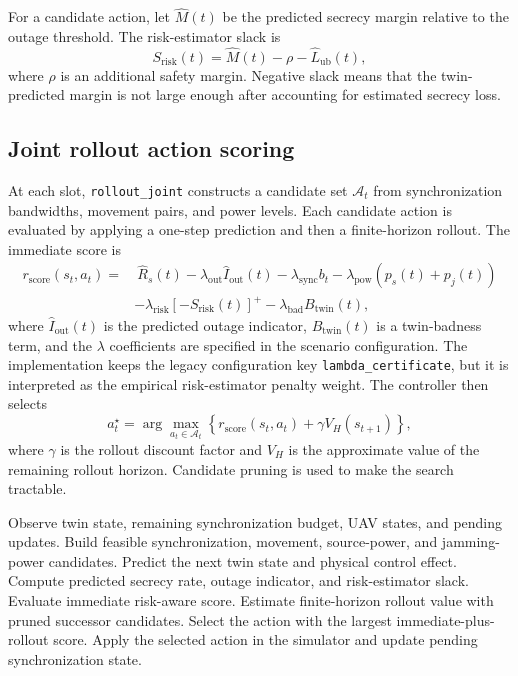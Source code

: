 For a candidate action, let $\widehat{M}(t)$ be the predicted secrecy margin relative to the outage threshold. The risk-estimator slack is
\begin{equation}
    S_{\mathrm{risk}}(t)=\widehat{M}(t)-\rho-\widehat{L}_{\mathrm{ub}}(t),
\end{equation}
where $\rho$ is an additional safety margin. Negative slack means that the twin-predicted margin is not large enough after accounting for estimated secrecy loss.

\subsection{Joint rollout action scoring}

At each slot, \texttt{rollout\_joint} constructs a candidate set $\mathcal{A}_t$ from synchronization bandwidths, movement pairs, and power levels. Each candidate action is evaluated by applying a one-step prediction and then a finite-horizon rollout. The immediate score is
\begin{align}
    r_{\mathrm{score}}(s_t,a_t) =
    &\ \widehat{R}_s(t)
    -\lambda_{\mathrm{out}}\widehat{I}_{\mathrm{out}}(t)
    -\lambda_{\mathrm{sync}} b_t
    -\lambda_{\mathrm{pow}}(p_s(t)+p_j(t)) \nonumber \\
    &-\lambda_{\mathrm{risk}}[ -S_{\mathrm{risk}}(t)]^+
    -\lambda_{\mathrm{bad}}B_{\mathrm{twin}}(t),
\end{align}
where $\widehat{I}_{\mathrm{out}}(t)$ is the predicted outage indicator, $B_{\mathrm{twin}}(t)$ is a twin-badness term, and the $\lambda$ coefficients are specified in the scenario configuration. The implementation keeps the legacy configuration key \texttt{lambda\_certificate}, but it is interpreted as the empirical risk-estimator penalty weight. The controller then selects
\begin{equation}
    a_t^\star=\arg\max_{a_t\in\mathcal{A}_t}
    \left\{
    r_{\mathrm{score}}(s_t,a_t)+\gamma V_H(s_{t+1})
    \right\},
\end{equation}
where $\gamma$ is the rollout discount factor and $V_H$ is the approximate value of the remaining rollout horizon. Candidate pruning is used to make the search tractable.

\begin{algorithm}[t]
\caption{Empirical-risk-aware joint rollout controller}
\label{alg:rollout}
\begin{algorithmic}[1]
\State Observe twin state, remaining synchronization budget, UAV states, and pending updates.
\State Build feasible synchronization, movement, source-power, and jamming-power candidates.
    \State Predict the next twin state and physical control effect.
    \State Compute predicted secrecy rate, outage indicator, and risk-estimator slack.
    \State Evaluate immediate risk-aware score.
    \State Estimate finite-horizon rollout value with pruned successor candidates.
\EndFor
\State Select the action with the largest immediate-plus-rollout score.
\State Apply the selected action in the simulator and update pending synchronization state.
\end{algorithmic}
\end{algorithm}

